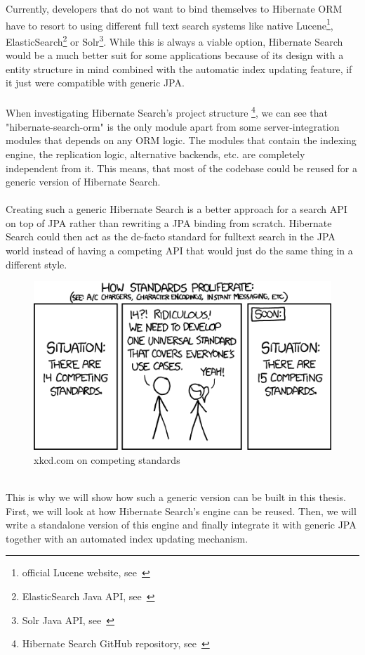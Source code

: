 \noindent
Currently, developers that do not want to bind themselves to Hibernate ORM have to resort to using different full text search systems like native Lucene\footnote{official Lucene website, see~\cite{lucene_apache_org}}, ElasticSearch\footnote{ElasticSearch Java API, see~\cite{elasticsearch_java_api}} or Solr\footnote{Solr Java API, see~\cite{solr_java_api}}. While this is always a viable option, Hibernate Search would be a much better suit for some applications because of its design with a entity structure in mind combined with the automatic index updating feature, if it just were compatible with generic JPA.
\\\\
When investigating Hibernate Search's project structure
\footnote{Hibernate Search GitHub repository, see~\cite{hsearch_source_code_git}}, we can see that "hibernate-search-orm" is the only module apart from some server-integration modules that depends on any ORM logic. The modules that contain the indexing engine, the replication logic, alternative backends, etc. are completely independent from it. This means, that most of the codebase could be reused for a generic version of Hibernate Search.
\\\\
\noindent
Creating such a generic Hibernate Search is a better approach for a search API on top of JPA rather than rewriting a JPA binding from scratch. Hibernate Search could then act as the de-facto standard for fulltext search in the JPA world instead of having a competing API that would just do the same thing in a different style.
\\
\begin{figure}[ht]
	\centering
	\includegraphics[scale=0.5]{images/competing_standards.png}
	\caption{xkcd.com on competing standards \protect\footnotemark}
	\label{xkcd_standards_fig}
\end{figure}
\\
This is why we will show how such a generic version can be built in this thesis. First, we will look at how Hibernate Search's engine can be reused. Then, we will write a standalone version of this engine and finally integrate it with generic JPA together with an automated index updating mechanism.

